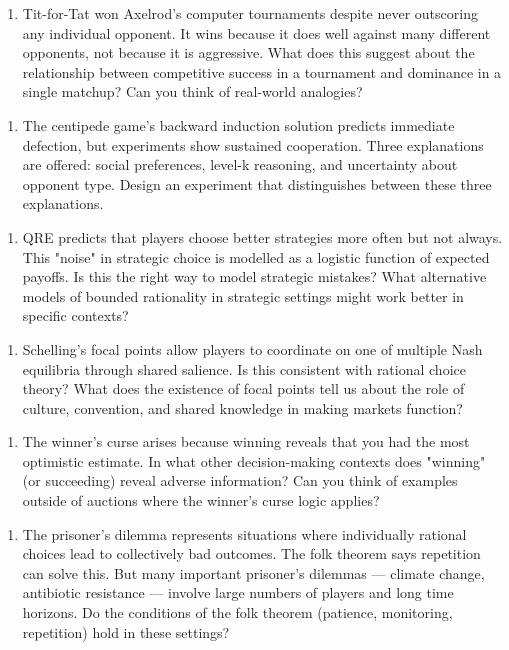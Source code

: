 \documentclass[12pt, letterpaper]{article}
\begin{document}
\begin{enumerate}
\item Tit-for-Tat won Axelrod's computer tournaments despite never outscoring any individual opponent. It wins because it does well against many different opponents, not because it is aggressive. What does this suggest about the relationship between competitive success in a tournament and dominance in a single matchup? Can you think of real-world analogies?
\end{enumerate}

\begin{enumerate}
\item The centipede game's backward induction solution predicts immediate defection, but experiments show sustained cooperation. Three explanations are offered: social preferences, level-k reasoning, and uncertainty about opponent type. Design an experiment that distinguishes between these three explanations.
\end{enumerate}

\begin{enumerate}
\item QRE predicts that players choose better strategies more often but not always. This "noise" in strategic choice is modelled as a logistic function of expected payoffs. Is this the right way to model strategic mistakes? What alternative models of bounded rationality in strategic settings might work better in specific contexts?
\end{enumerate}

\begin{enumerate}
\item Schelling's focal points allow players to coordinate on one of multiple Nash equilibria through shared salience. Is this consistent with rational choice theory? What does the existence of focal points tell us about the role of culture, convention, and shared knowledge in making markets function?
\end{enumerate}

\begin{enumerate}
\item The winner's curse arises because winning reveals that you had the most optimistic estimate. In what other decision-making contexts does "winning" (or succeeding) reveal adverse information? Can you think of examples outside of auctions where the winner's curse logic applies?
\end{enumerate}

\begin{enumerate}
\item The prisoner's dilemma represents situations where individually rational choices lead to collectively bad outcomes. The folk theorem says repetition can solve this. But many important prisoner's dilemmas --- climate change, antibiotic resistance --- involve large numbers of players and long time horizons. Do the conditions of the folk theorem (patience, monitoring, repetition) hold in these settings?
\end{enumerate}
\end{document}
